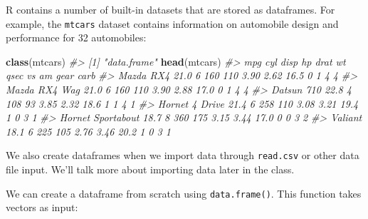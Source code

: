 \documentclass[]{book}
\newenvironment{Shaded}{\begin{snugshade}}{\end{snugshade}}
\newcommand{\CommentTok}[1]{\textcolor[rgb]{0.56,0.35,0.01}{\textit{#1}}}
\newcommand{\KeywordTok}[1]{\textcolor[rgb]{0.13,0.29,0.53}{\textbf{#1}}}
\newcommand{\NormalTok}[1]{#1}
\begin{document}
R contains a number of built-in datasets that are stored as dataframes. For example, the \texttt{mtcars} dataset contains information on automobile design and performance for 32 automobiles:

\begin{Shaded}
\begin{Highlighting}[]
\KeywordTok{class}\NormalTok{(mtcars)}
\CommentTok{#> [1] "data.frame"}
\KeywordTok{head}\NormalTok{(mtcars)}
\CommentTok{#>                    mpg cyl disp  hp drat   wt qsec vs am gear carb}
\CommentTok{#> Mazda RX4         21.0   6  160 110 3.90 2.62 16.5  0  1    4    4}
\CommentTok{#> Mazda RX4 Wag     21.0   6  160 110 3.90 2.88 17.0  0  1    4    4}
\CommentTok{#> Datsun 710        22.8   4  108  93 3.85 2.32 18.6  1  1    4    1}
\CommentTok{#> Hornet 4 Drive    21.4   6  258 110 3.08 3.21 19.4  1  0    3    1}
\CommentTok{#> Hornet Sportabout 18.7   8  360 175 3.15 3.44 17.0  0  0    3    2}
\CommentTok{#> Valiant           18.1   6  225 105 2.76 3.46 20.2  1  0    3    1}
\end{Highlighting}
\end{Shaded}

We also create dataframes when we import data through \texttt{read.csv} or other data file input. We'll talk more about importing data later in the class.

We can create a dataframe from scratch using \texttt{data.frame()}. This function takes vectors as input:
\end{document}
